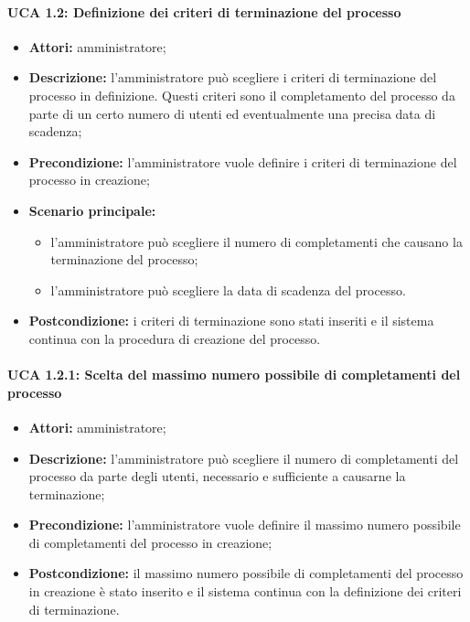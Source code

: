 \paragraph{UCA 1.2: Definizione dei criteri di terminazione del processo}
\begin{itemize}
\item \textbf{Attori:}
amministratore;
\item \textbf{Descrizione:}
l'amministratore può scegliere i criteri di terminazione del processo in definizione.
Questi criteri sono il completamento del processo da parte di un certo numero di utenti ed eventualmente una precisa data di scadenza;
\item \textbf{Precondizione:}
l'amministratore vuole definire i criteri di terminazione del processo in creazione;
\item \textbf{Scenario principale:}
\begin{itemize}
\item l'amministratore può scegliere il numero di completamenti che causano la terminazione del processo;
\item l'amministratore può scegliere la data di scadenza del processo.
\end{itemize}
\item \textbf{Postcondizione:}
i criteri di terminazione sono stati inseriti  e il sistema continua con la procedura di creazione del processo.
\end{itemize}

\paragraph{UCA 1.2.1: Scelta del massimo numero possibile di completamenti del processo}
\begin{itemize}
\item \textbf{Attori:}
amministratore;
\item \textbf{Descrizione:}
l'amministratore può scegliere il numero di completamenti del processo da parte degli utenti, necessario e sufficiente a causarne la terminazione;
\item \textbf{Precondizione:}
l'amministratore vuole definire il massimo numero possibile di completamenti del processo in creazione;
\item \textbf{Postcondizione:}
il massimo numero possibile di completamenti del processo in creazione è stato inserito e il sistema continua con la definizione dei criteri di terminazione.
\end{itemize}

